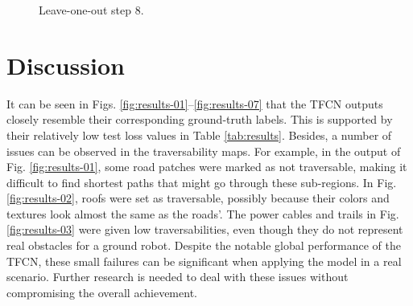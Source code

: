 \documentclass[conference]{IEEEtran}
\begin{document}
\begin{figure}[ht]
\centering
{}
\caption{Leave-one-out step 8.}
\label{fig:results-08}
\end{figure}

\section{Discussion}
\label{section:discussion}

It can be seen in Figs. \ref{fig:results-01}--\ref{fig:results-07} that the TFCN outputs closely resemble their corresponding ground-truth labels.
This is supported by their relatively low test loss values in Table \ref{tab:results}.
Besides, a number of issues can be observed in the traversability maps.
For example, in the output of Fig. \ref{fig:results-01}, some road patches were marked as not traversable, making it difficult to find shortest paths that might go through these sub-regions.
In Fig. \ref{fig:results-02}, roofs were set as traversable, possibly because their colors and textures look almost the same as the roads'.
The power cables and trails in Fig. \ref{fig:results-03} were given low traversabilities, even though they do not represent real obstacles for a ground robot.
Despite the notable global performance of the TFCN, these small failures can be significant when applying the model in a real scenario.
Further research is needed to deal with these issues without compromising the overall achievement.
\end{document}
